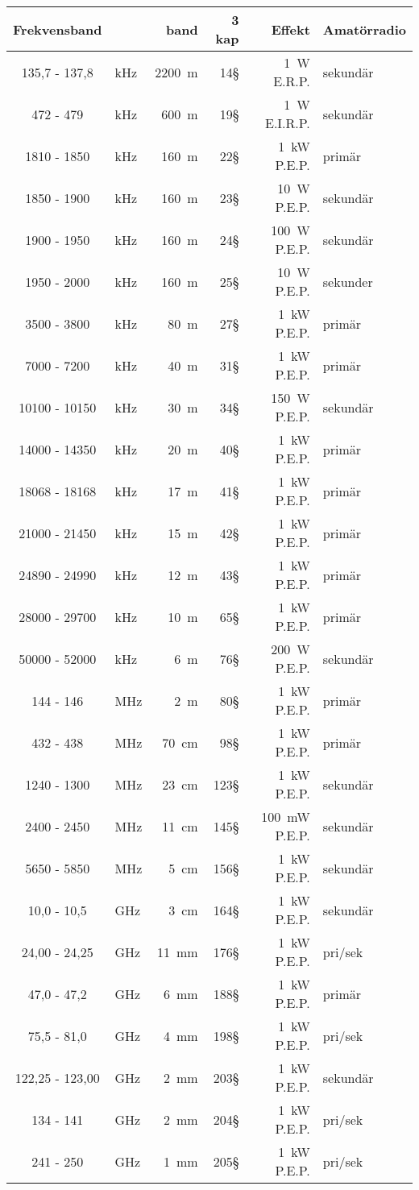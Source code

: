 \begin{tabular}{clr|rr|l}
Frekvensband    &     & band   & 3 kap & Effekt       & Amatörradio \\ \hline
  135,7 - 137,8 & kHz & 2200~m &  14§  & 1~W E.R.P.  & sekundär \\
  472   -   479 & kHz & 600~m  &  19§  & 1~W E.I.R.P. & sekundär \\
 1810   -  1850 & kHz & 160~m  &  22§  & 1~kW P.E.P.  & primär \\
 1850   -  1900 & kHz & 160~m  &  23§  & 10~W P.E.P.  & sekundär \\
 1900   -  1950 & kHz & 160~m  &  24§  & 100~W P.E.P. & sekundär \\
 1950   -  2000 & kHz & 160~m  &  25§  & 10~W P.E.P.  & sekunder \\
 3500   -  3800 & kHz &  80~m  &  27§  & 1~kW P.E.P.  & primär \\
 7000   -  7200 & kHz &  40~m  &  31§  & 1~kW P.E.P.  & primär \\
10100   - 10150 & kHz &  30~m  &  34§  & 150~W P.E.P. & sekundär \\
14000   - 14350 & kHz &  20~m  &  40§  & 1~kW P.E.P.  & primär \\
18068   - 18168 & kHz &  17~m  &  41§  & 1~kW P.E.P.  & primär \\
21000   - 21450 & kHz &  15~m  &  42§  & 1~kW P.E.P.  & primär \\
24890   - 24990 & kHz &  12~m  &  43§  & 1~kW P.E.P.  & primär \\
28000   - 29700 & kHz &  10~m  &  65§  & 1~kW P.E.P.  & primär \\
50000   - 52000 & kHz &   6~m  &  76§  & 200~W P.E.P. & sekundär \\ \hline
  144   -   146 & MHz &   2~m  &  80§  & 1~kW P.E.P.  & primär \\
  432   -   438 & MHz &  70~cm &  98§  & 1~kW P.E.P.  & primär \\
 1240   -  1300 & MHz &  23~cm & 123§  & 1~kW P.E.P.  & sekundär \\
 2400   -  2450 & MHz &  11~cm & 145§  & 100~mW P.E.P. & sekundär \\
 5650   -  5850 & MHz &   5~cm & 156§  & 1~kW P.E.P.  & sekundär \\
   10,0 -  10,5 & GHz &   3~cm & 164§  & 1~kW P.E.P.  & sekundär \\
   24,00 - 24,25 & GHz &  11~mm & 176§  & 1~kW P.E.P.  & pri/sek \\
   47,0 - 47,2  & GHz &   6~mm & 188§  & 1~kW P.E.P.  & primär \\
   75,5 - 81,0  & GHz &   4~mm & 198§  & 1~kW P.E.P.  & pri/sek \\
 122,25 - 123,00   & GHz &   2~mm & 203§  & 1~kW P.E.P.  & sekundär \\
    134 - 141   & GHz &   2~mm & 204§  & 1~kW P.E.P.  & pri/sek \\
    241 - 250   & GHz &   1~mm & 205§  & 1~kW P.E.P.  & pri/sek \\
\end{tabular}

